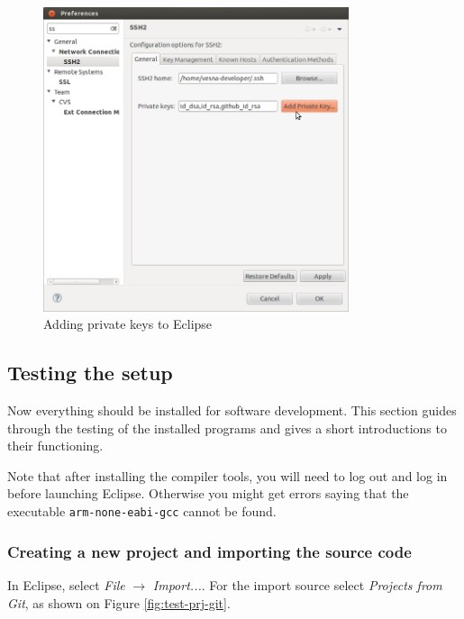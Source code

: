 \documentclass[a4paper, 10pt]{article}
\begin{document}
    \begin{figure}[H]
    \centering
        \includegraphics[width=0.8\textwidth]{./install-guide-linux-images/auth-add-key.png}
        \caption{Adding private keys to Eclipse}
        \label{fig:auth-add-key}
    \end{figure}

\subsection{Testing the setup}


Now everything should be installed for software development.
This section guides through the testing of the installed programs
and gives a short introductions to their functioning.

Note that after installing the compiler tools, you will need to log out
and log in before launching Eclipse. Otherwise you might get errors
saying that the executable \verb+arm-none-eabi-gcc+ cannot be found.

\subsubsection{Creating a new project and importing the source code}

In Eclipse, select \emph{File} $\rightarrow$ \emph{Import...}.
For the import source select \emph{Projects from Git}, as shown on
Figure \ref{fig:test-prj-git}.
\end{document}
